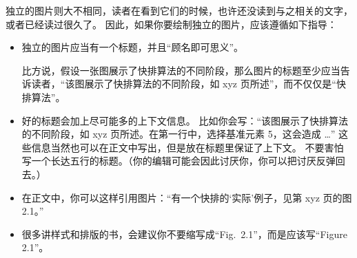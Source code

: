 独立的图片则大不相同，读者在看到它们的时候，也许还没读到与之相关的文字，或者已经读过很久了。
因此，如果你要绘制独立的图片，应该遵循如下指导：

\eohs

\begin{itemize}
\item
  独立的图片应当有一个标题，并且“顾名即可思义”。

  比方说，假设一张图展示了快排算法的不同阶段，那么图片的标题至少应当告诉读者，“该图展示了快排算法的不同阶段，如 xyz 页所述”，而不仅仅是“快排算法”。
\item
  好的标题会加上尽可能多的上下文信息。
  比如你会写：“该图展示了快排算法的不同阶段，如 xyz 页所述。在第一行中，选择基准元素 5，这会造成 \dots”
  这些信息当然也可以在正文中写出，但是放在标题里保证了上下文。
  不要害怕写一个长达五行的标题。（你的编辑可能会因此讨厌你，你可以把讨厌反弹回去。）
\item
  在正文中，你可以这样引用图片：“有一个快排的‘实际’例子，见第 xyz 页的图 2.1。”
\item
  很多讲样式和排版的书，会建议你不要缩写成“Fig.~2.1”，而是应该写“Figure 2.1”。


\end{itemize}
